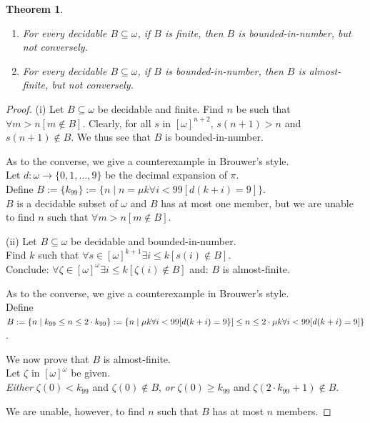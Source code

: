 \documentclass[a4paper]{amsart}
\theoremstyle{plain}
\newtheorem{theorem}{Theorem}
\begin{document}
\begin{theorem} \begin{enumerate}[\upshape (i)] \item For every decidable $B\subseteq\omega$, if $B$ is finite, then $B$ is bounded-in-number, but not conversely.
 \item For every decidable $B\subseteq \omega$, if $B$ is bounded-in-number, then $B$ is almost-finite, but not conversely. \end{enumerate} \end{theorem} \begin{proof} (i) Let $B\subseteq \omega$ be decidable and finite. Find  $n$ be such that $\forall m>n[m \notin B]$. Clearly, for all $s$ in $[\omega]^{n+2}$, $s(n+1)>n$ and $s(n+1)\notin B$. We thus see that $B$ is bounded-in-number. 
 
 As to the converse, we give a counterexample in Brouwer's style.\\ Let $d:\omega\rightarrow \{0,1,\ldots,9\}$ be the decimal expansion of $\pi$. \\Define $B:=\{k_{99}\}:=\{n \mid n=\mu k \forall i<99[d(k+i)=9]\}$. \\$B$ is a decidable subset of $\omega$ and $B$ has at most one member, but we are unable to find  $n$ such that $\forall m>n[m\notin B]$.
 
 \smallskip (ii) Let $B\subseteq \omega$ be decidable and bounded-in-number. \\Find $k$ such that $\forall s \in [\omega]^{k+1}\exists i\le k[s(i) \notin B]$. \\Conclude: $\forall \zeta \in [\omega]^\omega \exists i\le k[\zeta(i)\notin B]$ and: $B$ is almost-finite.
 
 As to the converse, we give  a counterexample in Brouwer's style. \\Define $B:=\{n\mid k_{99} \le n \le 2\cdot k_{99}\}:=\\ \{ n\mid \mu k \forall i<99[d(k+i)=9\}]\le n \le 2\cdot \mu k \forall i<99[d(k+i)=9]\}$. 
 
 We now prove that $B$ is almost-finite. \\ Let $\zeta$ in $[\omega]^\omega$ be given. \\\textit{Either} $\zeta(0)< k_{99}$ and $\zeta(0)\notin B$, \textit{or} $\zeta(0)\ge k_{99}$ and $\zeta(2\cdot k_{99} +1)\notin B$. 
 
 We are unable, however,  to find $n$ such that $B$ has at most $n$ members.   \end{proof} 
 
\end{document}
